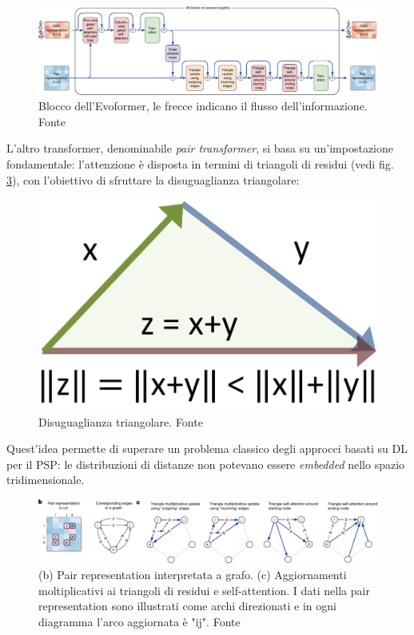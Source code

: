 \begin{figure}[!htb]
	\centering
	\includegraphics[scale=0.36]{images/evoformer.png}
	\caption{Blocco dell'Evoformer, le frecce indicano il flusso dell'informazione. Fonte\cite{jumper2021highly}}
	\label{fig:evoformer}
\end{figure}

L'altro transformer, denominabile \textit{pair transformer}, si basa su un'impostazione fondamentale: l'attenzione è disposta in termini di triangoli di residui (vedi fig. \ref{fig:triangoli-residui}), con l'obiettivo di sfruttare la disuguaglianza triangolare:

\begin{figure}[!htb]
	\centering
	\includegraphics[scale=0.15]{images/disuguaglianza triangolare.PNG}
	\caption{Disuguaglianza triangolare. Fonte\cite{disTriang}}
	\label{fig:}
\end{figure}

Quest'idea permette di superare un problema classico degli approcci basati su DL per il PSP: le distribuzioni di distanze non potevano essere \textit{embedded} nello spazio tridimensionale. 

\begin{figure}[!htb]
	\centering
	\includegraphics[scale=0.42]{images/triangoli.png}
	\caption{(b) Pair representation interpretata a grafo. (c) Aggiornamenti moltiplicativi ai triangoli di residui e self-attention. I dati nella pair representation sono illustrati come archi direzionati e in ogni diagramma l'arco aggiornata è "ij". Fonte\cite{jumper2021highly}}
	\label{fig:triangoli-residui}
\end{figure}

